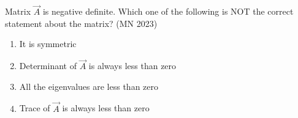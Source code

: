 \item Matrix $\vec{A}$ is negative definite. Which one of the following is NOT the correct statement about the matrix?
	\hfill(MN 2023)
\begin{multicols}{2}
\begin{enumerate}
    \item It is symmetric
    \item Determinant of $\vec{A}$ is always less than zero
    \item All the eigenvalues are less than zero
    \item Trace of $\vec{A}$ is always less than zero
\end{enumerate}
\end{multicols}
